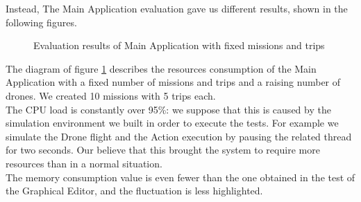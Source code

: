 \newpage

Instead, The Main Application evaluation gave us different results, shown in the following figures.
\\

\begin{figure}[h!]
\centering
  \caption{Evaluation results of Main Application with fixed missions and trips}
  \label{fig:mainApp1}
\end{figure}

The diagram of figure \ref{fig:mainApp1} describes the resources consumption of the Main Application with a fixed number of missions and trips and a raising number of drones. We created 10 missions with 5 trips each.
\\
The CPU load is constantly over 95\%: we suppose that this is caused by the simulation environment we built in order to execute the tests. For example we simulate the Drone flight and the Action execution by pausing the related thread for two seconds. Our believe that this brought the system to require more resources than in a normal situation.
\\

The memory consumption value is even fewer than the one obtained in the test of the Graphical Editor, and the fluctuation is less highlighted.
\\

